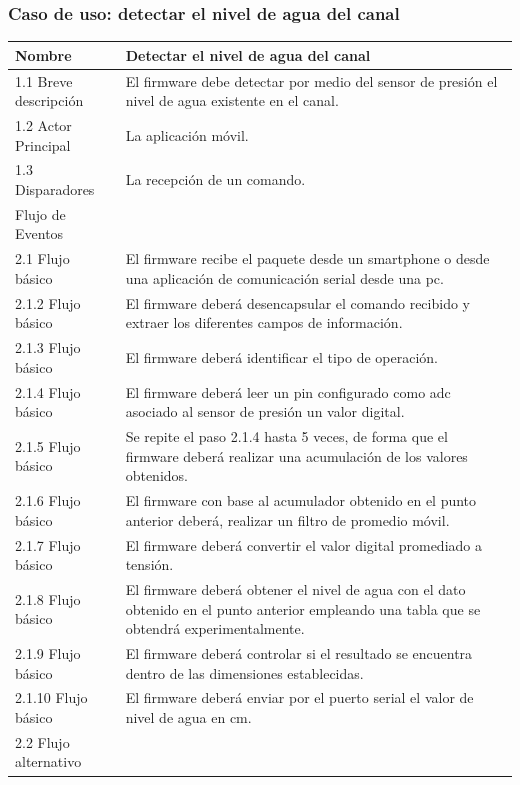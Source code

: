 \subsubsection{Caso de uso: detectar el nivel de agua del canal}
\begin{table}[t]
\begin{center}
\begin{tabular}{ | m{4cm} | m{9.5cm} | }
\hline Nombre & Detectar el nivel de agua del canal \\ \hline
1.1 Breve descripción & 
El firmware debe detectar por medio del sensor de presión el nivel de agua existente en el canal. \\ \hline

 1.2 Actor Principal&La aplicación móvil.\\ \hline


 1.3 Disparadores & La recepción de un comando. \\ \hline

Flujo de Eventos& \\ \hline

 2.1 Flujo básico &
El firmware recibe el paquete desde un smartphone  o desde una aplicación de comunicación serial desde una pc. \\ \hline


 2.1.2 Flujo básico &
El firmware deberá desencapsular el comando recibido y extraer los diferentes campos de información. \\ \hline

 2.1.3 Flujo básico &
El firmware deberá identificar el tipo de operación. \\ \hline


 2.1.4 Flujo básico &
El firmware deberá leer un pin configurado como adc asociado al sensor de presión un valor digital. \\ \hline
 

2.1.5 Flujo básico &
Se repite el paso 2.1.4 hasta 5 veces, de forma que el firmware deberá realizar una acumulación de los valores obtenidos. \\ \hline


2.1.6 Flujo básico &
 El firmware con base al acumulador obtenido en el punto anterior deberá, realizar un filtro de promedio móvil.  \\ \hline
 
2.1.7 Flujo básico &
El firmware deberá convertir el valor digital promediado a tensión. \\ \hline 
2.1.8 Flujo básico &
El firmware deberá obtener el nivel de agua con el dato obtenido en el punto anterior empleando una tabla que se obtendrá experimentalmente. \\ \hline
2.1.9 Flujo básico &
El firmware deberá controlar si el resultado se encuentra dentro de las dimensiones establecidas. \\ \hline
2.1.10 Flujo básico &
El firmware deberá enviar por el puerto serial el valor de nivel de agua en cm. \\ \hline
2.2 Flujo alternativo &  \\ \hline



\end{tabular}
\end{center}
\end{table}
